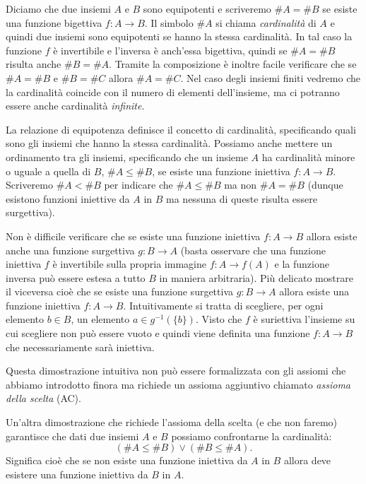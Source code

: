 \documentclass[italian,a4paper,hidelinks,headinclude]{scrartcl}
\newcommand{\myemph}[1]{\emph{#1}\marginpar{#1}}
\begin{document}
Diciamo che due insiemi $A$ e $B$ sono equipotenti e scriveremo $\#A = \#B$
se esiste una funzione bigettiva $f\colon A \to B$.
Il simbolo $\#A$ si chiama \myemph{cardinalità} di $A$ e quindi due insiemi
sono equipotenti se hanno la stessa cardinalità.
In tal caso la funzione
$f$ è invertibile e l'inversa è anch'essa bigettiva,
quindi se $\#A = \#B$ risulta anche $\#B = \#A$.
Tramite la composizione è inoltre facile verificare che se $\#A = \#B$ e $\#B = \#C$
allora $\#A = \#C$.
Nel caso degli insiemi finiti vedremo che la cardinalità coincide con il
numero di elementi dell'insieme, ma ci potranno essere anche cardinalità
\emph{infinite}.

La relazione di equipotenza definisce il concetto di cardinalità, specificando
quali sono gli insiemi che hanno la stessa cardinalità. Possiamo anche mettere
un ordinamento tra gli insiemi, specificando che un insieme $A$ ha cardinalità
minore o uguale a quella di $B$, $\#A\le \#B$, se esiste una funzione
iniettiva $f\colon A \to B$. Scriveremo $\#A < \#B$ per indicare che
$\#A \le \#B$ ma non $\#A = \#B$ (dunque esistono funzioni iniettive da $A$ in $B$
ma nessuna di queste risulta essere surgettiva).

Non è difficile verificare che se esiste una funzione iniettiva $f\colon A\to B$
allora esiste anche una funzione surgettiva $g\colon B\to A$
(basta osservare che una funzione iniettiva $f$ è invertibile sulla propria
immagine $f\colon A \to f(A)$ e la funzione inversa può essere estesa a
tutto $B$ in maniera arbitraria).
Più delicato mostrare il viceversa cioè che se esiste una funzione surgettiva
$g\colon B \to A$ allora esiste una funzione iniettiva $f\colon A \to B$.
Intuitivamente si tratta di scegliere, per ogni elemento $b\in B$, un elemento
$a\in g^{-1}(\{b\})$. Visto che $f$ è suriettiva l'insieme su cui scegliere non
può essere vuoto e quindi viene definita una funzione $f\colon A \to B$ che
necessariamente sarà iniettiva.

Questa dimostrazione intuitiva non può essere formalizzata con gli assiomi che
abbiamo introdotto finora ma richiede un assioma aggiuntivo chiamato
\myemph{assioma della scelta} (AC).

Un'altra dimostrazione che richiede l'assioma della scelta (e che non faremo)
garantisce che dati due insiemi $A$ e $B$ possiamo confrontarne la cardinalità:
\[
  (\#A \le \#B) \lor (\#B \le \#A).
\]
Significa cioè che se non esiste una funzione iniettiva da $A$ in $B$ allora
deve esistere una funzione iniettiva da $B$ in $A$.
\end{document}
